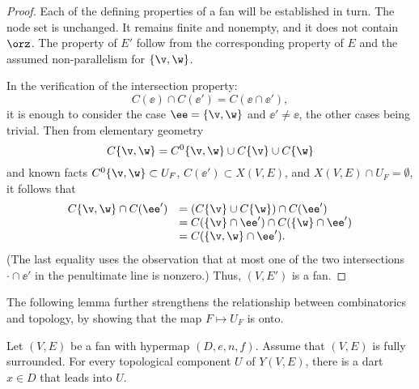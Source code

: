 \begin{proof} Each of the defining properties of a fan will be
established in turn.  The node set is unchanged.  It remains finite
and nonempty, and it does not contain $\orz$.  The property
 of $E'$ follow from the corresponding property
of $E$ and the assumed non-parallelism for $\{\v,\w\}$.

In the verification of the intersection property:
\begin{displaymath}
C(\ee)\cap C(\ee') = C(\ee \cap \ee'),
\end{displaymath}
it is enough to consider the case $\ee = \{\v,\w\}$ and $\ee' \ne
\ee$, the other cases being trivial.  Then from elementary geometry 
\begin{displaymath}
C\{\v,\w\} = C^0\{\v,\w\}\cup C\{\v\}\cup C\{\w\}
\end{displaymath}
and
known facts
$C^0\{\v,\w\}\subset U_F$, $C(\ee')\subset X(V,E)$, and $X(V,E)\cap
U_F=\emptyset$, it follows that
\begin{displaymath}
\begin{array}{rll}
C\{\v,\w\} \cap C(\ee')  &= (C\{\v\} \cup C\{\w\}) \cap C(\ee') \\
&= C(\{\v\}\cap \ee') \cap C(\{\w\}\cap \ee')\\
&= C(\{\v,\w\}\cap \ee').
\end{array}
\end{displaymath}
(The last equality uses the observation that at most one of the two
intersections $\cdot\cap\ee'$ in the penultimate line is nonzero.)
Thus, $(V,E')$ is a fan.
\end{proof}

The following lemma further strengthens the relationship between
combinatorics and topology, by showing that the map $F\mapsto U_F$
is onto.

\begin{lemma}[]\label{lemma:lead-exists}
Let $(V,E)$ be a fan with hypermap $(D,e,n,f)$. %
Assume that $(V,E)$ is fully surrounded.  For every
topological component $U$ of $Y(V,E)$, there is a dart $x\in D$ that
leads into $U$.
\end{lemma}
%
%
%

